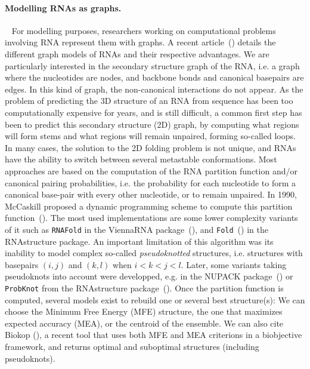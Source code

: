 \documentclass{bioinfo}
\begin{document}
\paragraph{Modelling RNAs as graphs.} ~ 
For modelling purposes, researchers working on computational problems involving RNA represent them with graphs.  A recent article~(\citealp{schlick2018adventures}) details the different graph models of RNAs and their respective advantages. 
We are particularly interested in the secondary structure graph of the RNA, i.e. a graph where the nucleotides are nodes, and backbone bonds and canonical basepairs are edges. In this kind of graph, the non-canonical interactions do not appear. 
As the problem of predicting the 3D structure of an RNA from sequence has been too computationally expensive for years, and is still difficult, a common first step has been to predict this secondary structure (2D) graph, by computing what regions will form stems and what regions will remain unpaired, forming so-called loops. In many cases, the solution to the 2D folding problem is not unique, and RNAs have the ability to switch between several metastable conformations. Most approaches are based on the computation of the RNA partition function and/or canonical pairing probabilities, i.e. the probability for each nucleotide to form a canonical base-pair with every other nucleotide, or to remain unpaired.
In 1990, McCaskill proposed a dynamic programming scheme to compute this partition function~(\citealp{mccaskill1990equilibrium}). The most used implementations are some lower complexity variants of it such as \texttt{RNAFold} in the ViennaRNA package~(\citealp{lorenz_viennarna_2011}), and \texttt{Fold}~(\citealp{mathews2004using}) in the RNAstructure package. An important limitation of this algorithm was its inability to model complex so-called \textit{pseudoknotted} structures, i.e. structures with basepairs $(i,j)$ and $(k,l)$ when $i<k<j<l$. 
Later, some variants taking pseudoknots into account were developped, e.g. in the NUPACK package~(\citealp{dirksAlgorithmComputingNucleic2004}) or \texttt{ProbKnot} from the RNAstructure package~(\citealp{bellaousov2010probknot}).
Once the  partition function is computed, several models exist to rebuild one or several best structure(s): We can choose the Minimum Free Energy (MFE) structure, the one that maximizes expected accuracy (MEA), or the centroid of the ensemble. We can also cite Biokop (\citealp{legendre_bi-objective_2018}), a recent tool that uses both MFE and MEA criterions in a biobjective framework, and returns optimal and suboptimal structures (including pseudoknots).
\end{document}
